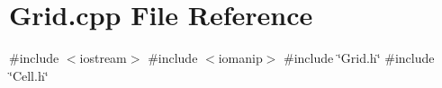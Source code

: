 \section{Grid.\+cpp File Reference}
\label{Grid_8cpp}
{\ttfamily \#include $<$iostream$>$}\newline
{\ttfamily \#include $<$iomanip$>$}\newline
{\ttfamily \#include \char`\"{}Grid.\+h\char`\"{}}\newline
{\ttfamily \#include \char`\"{}Cell.\+h\char`\"{}}\newline
